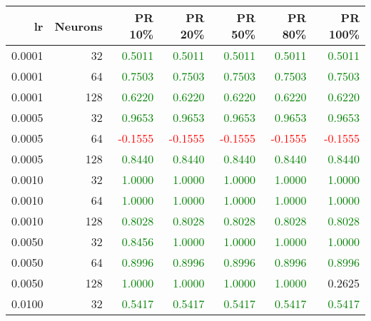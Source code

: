 \begin{tabular}{rrrrrrr}
\toprule
lr & Neurons & PR 10\% & PR 20\% & PR 50\% & PR 80\% & PR 100\% \\
\midrule
0.0001 & 32 & \textcolor{green} {0.5011} & \textcolor{green} {0.5011} & \textcolor{green} {0.5011} & \textcolor{green} {0.5011} & \textcolor{green} {0.5011} \\
0.0001 & 64 & \textcolor{green} {0.7503} & \textcolor{green} {0.7503} & \textcolor{green} {0.7503} & \textcolor{green} {0.7503} & \textcolor{green} {0.7503} \\
0.0001 & 128 & \textcolor{green} {0.6220} & \textcolor{green} {0.6220} & \textcolor{green} {0.6220} & \textcolor{green} {0.6220} & \textcolor{green} {0.6220} \\
0.0005 & 32 & \textcolor{green} {0.9653} & \textcolor{green} {0.9653} & \textcolor{green} {0.9653} & \textcolor{green} {0.9653} & \textcolor{green} {0.9653} \\
0.0005 & 64 & \textcolor{red} {-0.1555} & \textcolor{red} {-0.1555} & \textcolor{red} {-0.1555} & \textcolor{red} {-0.1555} & \textcolor{red} {-0.1555} \\
0.0005 & 128 & \textcolor{green} {0.8440} & \textcolor{green} {0.8440} & \textcolor{green} {0.8440} & \textcolor{green} {0.8440} & \textcolor{green} {0.8440} \\
0.0010 & 32 & \textcolor{green} {1.0000} & \textcolor{green} {1.0000} & \textcolor{green} {1.0000} & \textcolor{green} {1.0000} & \textcolor{green} {1.0000} \\
0.0010 & 64 & \textcolor{green} {1.0000} & \textcolor{green} {1.0000} & \textcolor{green} {1.0000} & \textcolor{green} {1.0000} & \textcolor{green} {1.0000} \\
0.0010 & 128 & \textcolor{green} {0.8028} & \textcolor{green} {0.8028} & \textcolor{green} {0.8028} & \textcolor{green} {0.8028} & \textcolor{green} {0.8028} \\
0.0050 & 32 & \textcolor{green} {0.8456} & \textcolor{green} {1.0000} & \textcolor{green} {1.0000} & \textcolor{green} {1.0000} & \textcolor{green} {1.0000} \\
0.0050 & 64 & \textcolor{green} {0.8996} & \textcolor{green} {0.8996} & \textcolor{green} {0.8996} & \textcolor{green} {0.8996} & \textcolor{green} {0.8996} \\
0.0050 & 128 & \textcolor{green} {1.0000} & \textcolor{green} {1.0000} & \textcolor{green} {1.0000} & \textcolor{green} {1.0000} & \textcolor{blu} {0.2625} \\
0.0100 & 32 & \textcolor{green} {0.5417} & \textcolor{green} {0.5417} & \textcolor{green} {0.5417} & \textcolor{green} {0.5417} & \textcolor{green} {0.5417} \\

\end{tabular}

